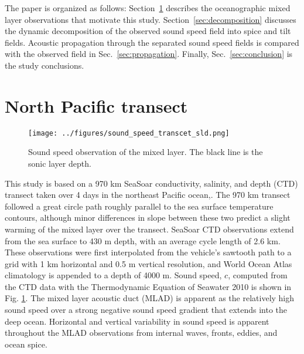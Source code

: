 \documentclass[preprint,NumberedRefs]{JASA}
\begin{document}
The paper is organized as follows: Section~\ref{sec:transcet} describes the oceanographic mixed layer observations that motivate this study. Section~\ref{sec:decomposition} discusses the dynamic decomposition of the observed sound speed field into spice and tilt fields. Acoustic propagation through the separated sound speed fields is compared with the observed field in Sec.~\ref{sec:propagation}. Finally, Sec.~\ref{sec:conclusion} is the study conclusions.

\section{North Pacific transect}\label{sec:transcet}
\begin{figure}
\texttt{[image: ../figures/sound\_speed\_transcet\_sld.png]}
\caption{\label{fig:c_grid}{Sound speed observation of the mixed layer. The black line is the sonic layer depth.}}
\end{figure}

This study is based on a 970 km SeaSoar conductivity, salinity, and depth (CTD) transect taken over 4 days in the northeast Pacific ocean,\citep{cole2010seasonal}. The 970 km transect followed a great circle path roughly parallel to the sea surface temperature contours, although minor differences in slope between these two predict a slight warming of the mixed layer over the transect. SeaSoar CTD observations extend from the sea surface to 430 m depth, with an average cycle length of 2.6 km. These observations were first interpolated from the vehicle's sawtooth path to a grid with 1 km horizontal and 0.5 m vertical resolution\citep{colosi2020observations}, and World Ocean Atlas climatology is appended to a depth of 4000 m\citep{WOA}. Sound speed, $c$, computed from the CTD data with the Thermodynamic Equation of Seawater 2010\cite{TEOS-10} is shown in Fig. \ref{fig:c_grid}. The mixed layer acoustic duct (MLAD) is apparent as the relatively high sound speed over a strong negative sound speed gradient that extends into the deep ocean. Horizontal and vertical variability in sound speed is apparent throughout the MLAD observations from internal waves, fronts, eddies, and ocean spice\citep{colosi2020observations}.
\end{document}

